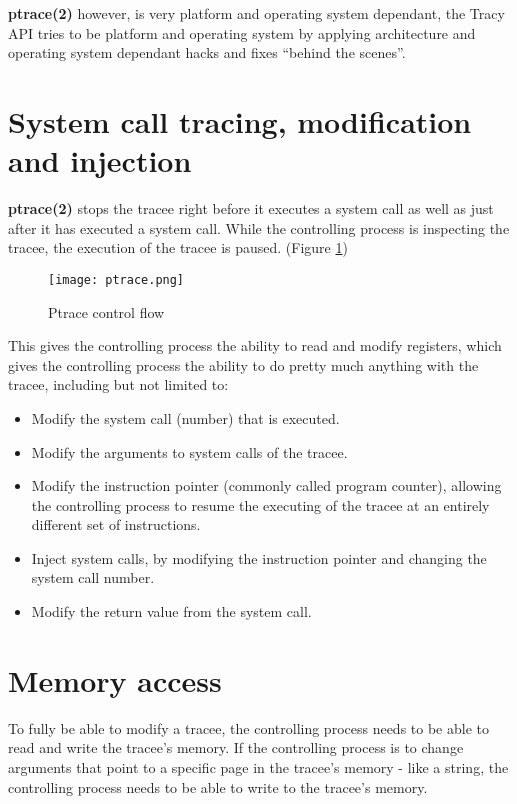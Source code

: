 \documentclass[a4paper, twoside, 10pt, twocolumn]{report}
\begin{document}
\textbf{ptrace(2)} however, is very platform and operating system dependant,
the Tracy API tries to be platform and operating system by applying architecture
and operating system dependant hacks and fixes ``behind the scenes''.

\section{System call tracing, modification and injection}

\textbf{ptrace(2)} stops the tracee right before it executes a system call as
well as just after it has executed a system call.
While the controlling process is inspecting the tracee, the execution of the
tracee is paused. (Figure \ref{fig1})


\begin{figure}
\label{fig1}
\texttt{[image: ptrace.png]}
\caption{Ptrace control flow}
\end{figure}

This gives the controlling process the ability to read and modify registers,
which gives the controlling process the ability to do pretty much anything
with the tracee, including but not limited to:

\begin{itemize}
\item Modify the system call (number) that is executed.
\item Modify the arguments to system calls of the tracee.
\item Modify the instruction pointer (commonly called program counter), allowing
    the controlling process to resume the executing of the tracee at an entirely
    different set of instructions.
\item Inject system calls, by modifying the instruction pointer and changing the
    system call number.
\item Modify the return value from the system call.
\end{itemize}

\section{Memory access}

To fully be able to modify a tracee, the controlling process needs to be able to
read and write the tracee's memory. If the controlling process is to change
arguments that point to a specific page in the tracee's memory - like a string,
the controlling process needs to be able to write to the tracee's memory.
\end{document}
